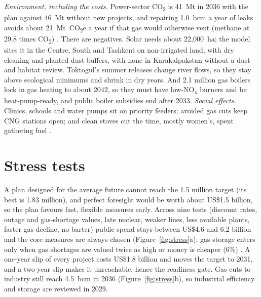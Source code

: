 \documentclass[11pt,letterpaper]{article}
\begin{document}
\textit{Environment, including the costs.} Power-sector CO\textsubscript{2} is 41~Mt in 2036 with the plan against 46~Mt without new projects, and repairing 1.0~bcm a year of leaks avoids about 21~Mt~CO\textsubscript{2}e a year if that gas would otherwise vent (methane at 29.8 times CO\textsubscript{2}) \cite{ipcc-ar6}. There are negatives. Solar needs about 22,000~ha; the model sites it in the Centre, South and Tashkent on non-irrigated land, with dry cleaning and planted dust buffers, with none in Karakalpakstan without a dust and habitat review. Toktogul's summer releases change river flows, so they stay above ecological minimums and shrink in dry years. And 2.1 million gas boilers lock in gas heating to about 2042, so they must have low-NO\textsubscript{x} burners and be heat-pump-ready, and public boiler subsidies end after 2033. \textit{Social effects.} Clinics, schools and water pumps sit on priority feeders; avoided gas cuts keep CNG stations open; and clean stoves cut the time, mostly women's, spent gathering fuel \cite{wb-female}.


\noindent{}

\section{Stress tests}\label{sec:stress}

A plan designed for the average future cannot reach the 1.5 million target (its best is 1.83 million), and perfect foresight would be worth about US\$1.5 billion, so the plan favours fast, flexible measures early. Across nine tests (discount rates, outage and gas-shortage values, late nuclear, weaker lines, less available plants, faster gas decline, no barter) public spend stays between US\$4.6 and 6.2 billion and the core measures are always chosen (Figure~\ref{fig:stress}a); gas storage enters only when gas shortages are valued twice as high or money is cheaper (6\%) \cite{team-model}. A one-year slip of every project costs US\$1.8 billion and moves the target to 2031, and a two-year slip makes it unreachable, hence the readiness gate. Gas cuts to industry still reach 4.5~bcm in 2036 (Figure~\ref{fig:stress}b), so industrial efficiency and storage are reviewed in 2029.
\end{document}
